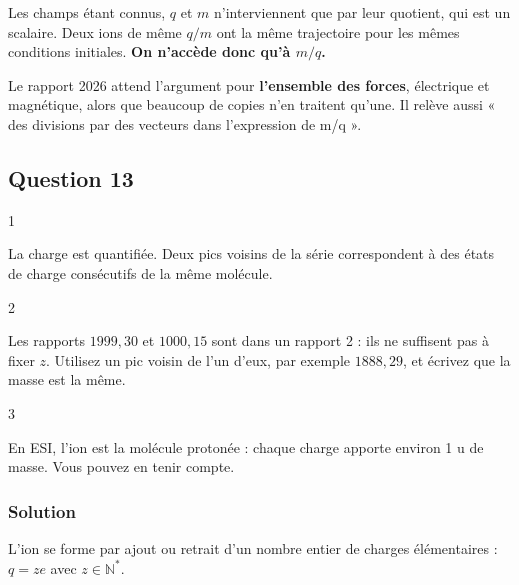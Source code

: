\documentclass[11pt,a4paper]{article}
\newcommand{\equationajustee}[1]{%
  \sbox{\boiteequation}{$\displaystyle #1$}%
  \ifdim\wd\boiteequation>\linewidth
    \[\resizebox{\linewidth}{!}{\usebox{\boiteequation}}\]%
  \else
    \[#1\]%
  \fi}
\begin{document}
\equationajustee{\frac{\mathrm d\vec v}{\mathrm dt}=\frac qm(\vec E+\vec v\wedge\vec B).}

Les champs étant connus, \(q\) et \(m\) n'interviennent que par leur quotient, qui est un scalaire. Deux ions de même \(q/m\) ont la même trajectoire pour les mêmes conditions initiales. \textbf{On n'accède donc qu'à \(m/q\).}

\begin{jury}

Le rapport 2026 attend l'argument pour \textbf{l'ensemble des forces}, électrique et magnétique, alors que beaucoup de copies n'en traitent qu'une. Il relève aussi « des divisions par des vecteurs dans l'expression de m/q ».

\end{jury}

\hypertarget{question-13}{%
\subsection{Question 13}\label{question-13}}

\begin{indication}{1}

La charge est quantifiée. Deux pics voisins de la série correspondent à des états de charge consécutifs de la même molécule.

\end{indication}

\begin{indication}{2}

Les rapports \(1999{,}30\) et \(1000{,}15\) sont dans un rapport 2 : ils ne suffisent pas à fixer \(z\). Utilisez un pic voisin de l'un d'eux, par exemple \(1888{,}29\), et écrivez que la masse est la même.

\end{indication}

\begin{indication}{3}

En ESI, l'ion est la molécule protonée : chaque charge apporte environ 1 u de masse. Vous pouvez en tenir compte.

\end{indication}

\hypertarget{solution-12}{%
\subsubsection{Solution}\label{solution-12}}

L'ion se forme par ajout ou retrait d'un nombre entier de charges élémentaires : \(q=ze\) avec \(z\in\mathbb N^*\).
\end{document}
